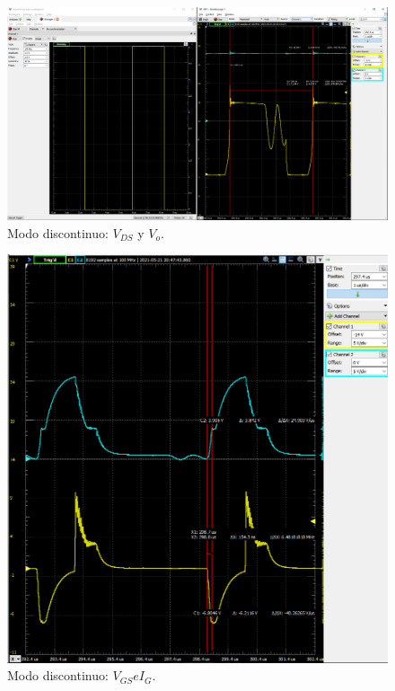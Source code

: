 \begin{figure}[H]
	\centering
	\includegraphics[width=\linewidth]{Imagenes/Discontinuo_VDS_VO}
	\caption{Modo discontinuo: $V_{DS}$ y $V_o$.}
	\label{fig:DISCONT_VDS_VO}
\end{figure}
\begin{figure}[H]
	\centering
	\includegraphics[width=\linewidth]{Imagenes/Discontinuo_VGS_IG}
	\caption{Modo discontinuo: $V_{GS} e I_G $.}
	\label{fig:DISC_VGS_IG}
\end{figure}
